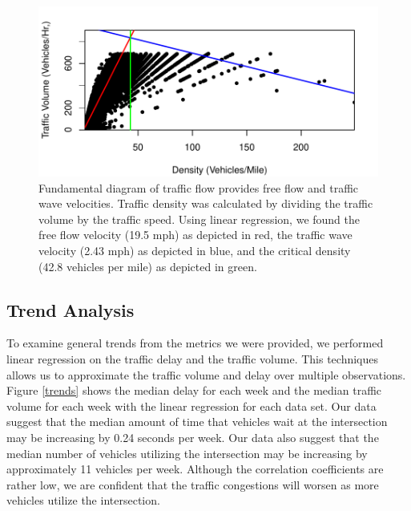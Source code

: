 \documentclass{report}
\begin{document}
\begin{figure}[h]
\centering
\includegraphics{upstat_report-003}
\caption{Fundamental diagram of traffic flow provides
free flow and traffic wave velocities. Traffic density was calculated by
dividing the traffic volume by the traffic speed. Using linear regression, we
found the free flow velocity (19.5 mph) as depicted in red, the traffic wave
velocity (2.43 mph) as depicted in blue, and the critical density (42.8 vehicles
per mile) as depicted in green.}
\label{fig:Fundamental}
\end{figure}


\subsection*{Trend Analysis}

To examine general trends from the metrics we were provided, we performed linear
regression on the traffic delay and the traffic volume. This techniques allows
us to approximate the traffic volume and delay over multiple observations.
Figure \ref{trends} shows the median delay for each week and
the median traffic volume for each week with the linear regression for each data
set. Our data suggest that the median amount of time that vehicles wait at the
intersection may be increasing by 0.24 seconds per week. Our data also suggest
that the median number of vehicles utilizing the intersection may be increasing
by approximately 11 vehicles per week. Although the correlation coefficients are
rather low, we are confident that the traffic congestions will worsen as more
vehicles utilize the intersection.
\end{document}
